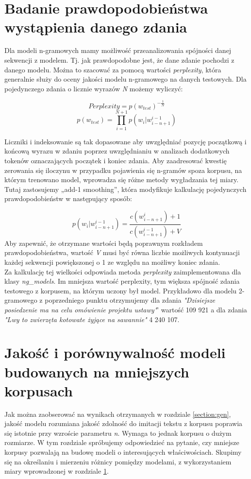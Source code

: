 \documentclass[a4paper,11pt,twoside]{report}
\theoremstyle{definition}
\begin{document}
\section{Badanie prawdopodobieństwa wystąpienia danego zdania} \label{section:perp}
Dla modeli n-gramowych mamy możliwość przeanalizowania spójności danej sekwencji z modelem. Tj. jak prawdopodobne jest, że dane zdanie pochodzi z danego modelu. Można to szacować za pomocą wartości \textit{perplexity}, która generalnie służy do oceny jakości modelu n-gramowego na danych testowych. Dla pojedynczego zdania o licznie wyrazów \textit{N} możemy wyliczyć:

\begin{equation}
Perplexity=p(w_{test})^{-\frac{1}{N}}
\end{equation}
\begin{equation}
p(w_{test})=\prod_{i=1}^{N+1} p(w_{i} | w_{i-n+1}^{i-1})
\label{eq53} \end{equation}

Liczniki i indeksowanie są tak dopasowane aby uwzględniać pozycję początkową i końcową wyrazu w zdaniu poprzez uwzględnianiu w analizach dodatkowych tokenów oznaczających początek i koniec zdania.
Aby zaadresować kwestię zerowania się iloczynu w przypadku pojawienia się n-gramów spoza korpusu, na którym trenowano model, wprowadza się różne metody wygładzania tej miary. Tutaj zastosujemy „add-1 smoothing”, która modyfikuje kalkulację pojedynczych prawdopodobieństw w następujący sposób:

\begin{equation}
p(w_{i} | w_{i-n+1}^{i-1}) = \frac{c(w_{i-n+1}^i)+1}{c(w_{i-n+1}^{i-1}) +V}
\label{eq54} \end{equation}
Aby zapewnić, że otrzymane wartości będą poprawnym rozkładem prawdopodobieństwa, wartość \textit{V} musi być równa liczbie możliwych kontynuacji każdej sekwencji powiększonej o 1 ze względu na możliwy koniec zdania.\\

Za kalkulację tej wielkości odpowiada metoda \textit{perplexity} zaimplementowana dla klasy \textit{ng\_models}. Im mniejsza wartość perplexity, tym większa spójność zdania testowego z korpusem, na którym uczony był model.
Przykładowo dla modelu 2-gramowego z poprzedniego punktu otrzymujemy dla zdania \textit{"Dzisiejsze posiedzenie ma na celu omówienie projektu ustawy"}’ wartość 109 921 a dla zdania \textit{"Lwy to zwierzęta kotowate żyjące na sawannie"} 4 240 107.

\section{Jakość i porównywalność modeli budowanych na mniejszych korpusach}
Jak można zaobserować na wynikach otrzymanych w rozdziale \ref{section:gen}, jakość modelu rozumiana jakość zdolność do imitacji tekstu z korpusu poprawia się istotnie przy wzroście parametru \textit{n}. Wymaga to jednak korpusu o dużym rozmiarze. W tym rozdziale spróbujemy odpowiedzieć na pytanie, czy mniejsze korpusy pozwalają na budowę modeli o interesujących właściwościach. Skupimy się na określaniu i mierzeniu różnicy pomiędzy modelami, z wykorzystaniem miary wprowadzonej w rozdziale \ref{section:perp}.
\end{document}
